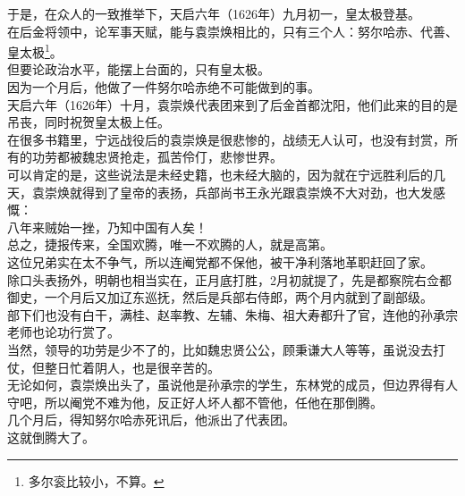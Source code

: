 \begin{multicols}{\theparacolNo}
于是，在众人的一致推举下，天启六年（1626年）九月初一，皇太极登基。\\

在后金将领中，论军事天赋，能与袁崇焕相比的，只有三个人：努尔哈赤、代善、皇太极\footnote{多尔衮比较小，不算。}。\\

但要论政治水平，能摆上台面的，只有皇太极。\\

因为一个月后，他做了一件努尔哈赤绝不可能做到的事。\\

天启六年（1626年）十月，袁崇焕代表团来到了后金首都沈阳，他们此来的目的是吊丧，同时祝贺皇太极上任。\\

在很多书籍里，宁远战役后的袁崇焕是很悲惨的，战绩无人认可，也没有封赏，所有的功劳都被魏忠贤抢走，孤苦伶仃，悲惨世界。\\

可以肯定的是，这些说法是未经史籍，也未经大脑的，因为就在宁远胜利后的几天，袁崇焕就得到了皇帝的表扬，兵部尚书王永光跟袁崇焕不大对劲，也大发感慨：\\

八年来贼始一挫，乃知中国有人矣！\\

总之，捷报传来，全国欢腾，唯一不欢腾的人，就是高第。\\

这位兄弟实在太不争气，所以连阉党都不保他，被干净利落地革职赶回了家。\\

除口头表扬外，明朝也相当实在，正月底打胜，2月初就提了，先是都察院右佥都御史，一个月后又加辽东巡抚，然后是兵部右侍郎，两个月内就到了副部级。\\

部下们也没有白干，满桂、赵率教、左辅、朱梅、祖大寿都升了官，连他的孙承宗老师也论功行赏了。\\

当然，领导的功劳是少不了的，比如魏忠贤公公，顾秉谦大人等等，虽说没去打仗，但整日忙着阴人，也是很辛苦的。\\

无论如何，袁崇焕出头了，虽说他是孙承宗的学生，东林党的成员，但边界得有人守吧，所以阉党不难为他，反正好人坏人都不管他，任他在那倒腾。\\

几个月后，得知努尔哈赤死讯后，他派出了代表团。\\

这就倒腾大了。\\


\end{multicols}
